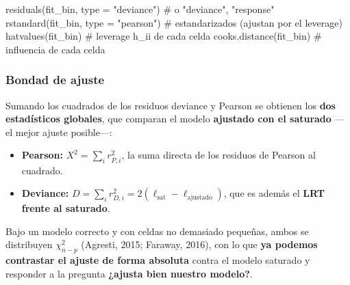 \documentclass[
  letterpaper,
  DIV=11,
  numbers=noendperiod]{scrartcl}
\newenvironment{Shaded}{\begin{snugshade}}{\end{snugshade}}
\newcommand{\AttributeTok}[1]{\textcolor[rgb]{0.40,0.45,0.13}{#1}}
\newcommand{\CommentTok}[1]{\textcolor[rgb]{0.37,0.37,0.37}{#1}}
\newcommand{\FunctionTok}[1]{\textcolor[rgb]{0.28,0.35,0.67}{#1}}
\newcommand{\NormalTok}[1]{\textcolor[rgb]{0.00,0.23,0.31}{#1}}
\newcommand{\StringTok}[1]{\textcolor[rgb]{0.13,0.47,0.30}{#1}}
\providecommand{\tightlist}{%
  \setlength{\itemsep}{0pt}\setlength{\parskip}{0pt}}\usepackage{longtable,booktabs,array}
\begin{document}
\begin{tcolorbox}[enhanced jigsaw, coltitle=black, rightrule=.15mm, arc=.35mm, leftrule=.75mm, colback=white, colbacktitle=quarto-callout-tip-color!10!white, left=2mm, breakable, toptitle=1mm, toprule=.15mm, bottomtitle=1mm, titlerule=0mm, title=\textcolor{quarto-callout-tip-color}{\faLightbulb}\hspace{0.5em}{🔧 En R. Residuos e influencia}, bottomrule=.15mm, opacityback=0, opacitybacktitle=0.6, colframe=quarto-callout-tip-color-frame]

\begin{Shaded}
\begin{Highlighting}[]
\FunctionTok{residuals}\NormalTok{(fit\_bin, }\AttributeTok{type =} \StringTok{"deviance"}\NormalTok{)     }\CommentTok{\# o "deviance", "response"}
\FunctionTok{rstandard}\NormalTok{(fit\_bin, }\AttributeTok{type =} \StringTok{"pearson"}\NormalTok{)     }\CommentTok{\# estandarizados (ajustan por el leverage)}
\FunctionTok{hatvalues}\NormalTok{(fit\_bin)                        }\CommentTok{\# leverage h\_ii de cada celda}
\FunctionTok{cooks.distance}\NormalTok{(fit\_bin)                   }\CommentTok{\# influencia de cada celda}
\end{Highlighting}
\end{Shaded}

\end{tcolorbox}

\hypertarget{bondad-de-ajuste}{%
\subsubsection{Bondad de ajuste}\label{bondad-de-ajuste}}

Sumando los cuadrados de los residuos deviance y Pearson se obtienen los
\textbf{dos estadísticos globales}, que comparan el modelo
\textbf{ajustado con el saturado} ---el mejor ajuste posible---:

\begin{itemize}
\tightlist
\item
  \textbf{Pearson:} \(X^2=\sum_i r_{P,i}^2\), la suma directa de los
  residuos de Pearson al cuadrado.
\item
  \textbf{Deviance:}
  \(D=\sum_i r_{D,i}^2=2(\ell_{\text{sat}}-\ell_{\text{ajustado}})\),
  que es además el \textbf{LRT frente al saturado}.
\end{itemize}

Bajo un modelo correcto y con celdas no demasiado pequeñas, ambos se
distribuyen \(\chi^2_{n-p}\) (Agresti, 2015; Faraway, 2016), con lo que
\textbf{ya podemos contrastar el ajuste de forma absoluta} contra el
modelo saturado y responder a la pregunta \textbf{¿ajusta bien nuestro
modelo?}.
\end{document}
